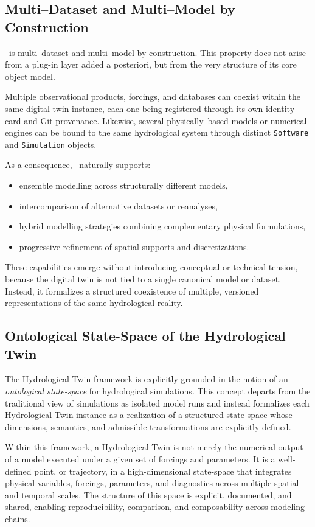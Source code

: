 \subsection{Multi--Dataset and Multi--Model by Construction}

\hydrot\ is multi--dataset and multi--model by construction. This property does not arise from a plug-in layer added a posteriori, but from the very structure of its core object model.

Multiple observational products, forcings, and databases can coexist within the same digital twin instance, each one being registered through its own identity card and Git provenance. Likewise, several physically--based models or numerical engines can be bound to the same hydrological system through distinct \texttt{Software} and \texttt{Simulation} objects.

As a consequence, \hydrot\ naturally supports:
\begin{itemize}
\item ensemble modelling across structurally different models,
\item intercomparison of alternative datasets or reanalyses,
\item hybrid modelling strategies combining complementary physical formulations,
\item progressive refinement of spatial supports and discretizations.
\end{itemize}

These capabilities emerge without introducing conceptual or technical tension, because the digital twin is not tied to a single canonical model or dataset. Instead, it formalizes a structured coexistence of multiple, versioned representations of the same hydrological reality.

\subsection{Ontological State-Space of the Hydrological Twin}

The Hydrological Twin framework is explicitly grounded in the notion of an \emph{ontological state-space} for hydrological simulations. This concept departs from the traditional view of simulations as isolated model runs and instead formalizes each Hydrological Twin instance as a realization of a structured state-space whose dimensions, semantics, and admissible transformations are explicitly defined.

Within this framework, a Hydrological Twin is not merely the numerical output of a model executed under a given set of forcings and parameters. It is a well-defined point, or trajectory, in a high-dimensional state-space that integrates physical variables, forcings, parameters, and diagnostics across multiple spatial and temporal scales. The structure of this space is explicit, documented, and shared, enabling reproducibility, comparison, and composability across modeling chains.

